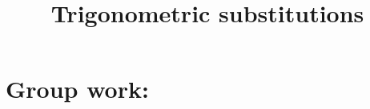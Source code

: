 \documentclass[]{ximera}
\title{Trigonometric substitutions}
\begin{document}
\begin{abstract}		\end{abstract}
\maketitle

\section{Group work:}
\end{document}
